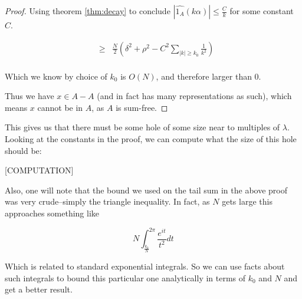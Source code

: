 \documentclass{article}
\theoremstyle{definition}
\theoremstyle{remark}
\numberwithin{equation}{section}
\begin{document}
\begin{proof}
  Using theorem \ref{thm:decay} to conclude
  $|\widehat{1_A}(k\alpha)| \leq \frac{C}{k}$ for some constant $C$.

  \begin{eqnarray*}
    &\geq& \frac{N}{2}\left(\delta^2 + \rho^2 - C^2 \sum_{|k| \geq k_0} \frac{1}{k^2}\right)\\
  \end{eqnarray*}
  
  Which we know by choice of $k_0$ is $O(N)$, and therefore larger
  than 0.

  Thus we have $x \in A - A$ (and in fact has many representations as
  such), which means $x$ cannot be in $A$, as $A$ is sum-free.
\end{proof}

This gives us that there must be some hole of some size near to
multiples of $\lambda$.  Looking at the constants in the proof, we can
compute what the size of this hole should be: 

{\color{red}

[COMPUTATION]

Also, one will note that the bound we used on the tail sum in the
above proof was very crude--simply the triangle inequality.  In fact,
as $N$ gets large this approaches something like

\[N \int_{\frac{k_0}{N}}^{2\pi} \frac{e^{it}}{t^2}dt\]

Which is related to standard exponential integrals.  So we can use
facts about such integrals to bound this particular one analytically
in terms of $k_0$ and $N$ and get a better result.

}



\end{document}
